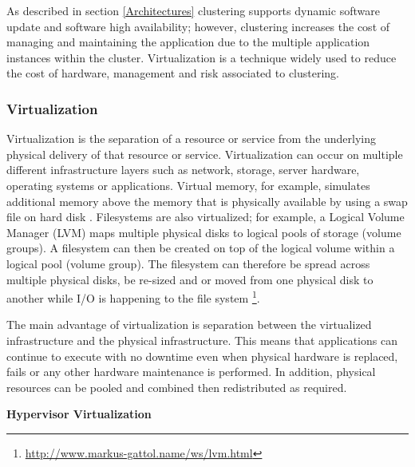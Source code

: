 \documentclass[a4paper,11pt,twoside]{article}
\begin{document}
As described in section \ref{Architectures} clustering supports dynamic software update and software high availability; however, clustering increases the cost of managing and maintaining the application due to the multiple application instances within the cluster. Virtualization is a technique widely used to reduce the cost of hardware, management and risk associated to clustering.

\subsubsection{Virtualization} 

Virtualization is the separation of a resource or service from the underlying physical delivery of that resource or service. Virtualization can occur on multiple different infrastructure layers such as network, storage, server hardware, operating systems or applications. Virtual memory, for example, simulates additional memory above the memory that is physically available by using a swap file on hard disk \cite{virtualization}. Filesystems are also virtualized; for example, a Logical Volume Manager (LVM) maps multiple physical disks to logical pools of storage (volume groups). A filesystem can then be created on top of the logical volume within a logical pool (volume group). The filesystem can therefore be spread across multiple physical disks, be re-sized and or moved from one physical disk to another while I/O is happening to the file system \footnote{ \url {http://www.markus-gattol.name/ws/lvm.html}}. 

The main advantage of virtualization is separation between the virtualized infrastructure and the physical infrastructure. This means that applications can continue to execute with no downtime even when physical hardware is replaced, fails or any other hardware maintenance is performed. In addition, physical resources can be pooled and combined then redistributed as required.\bigskip


\noindent
\textbf{Hypervisor Virtualization}
\end{document}
